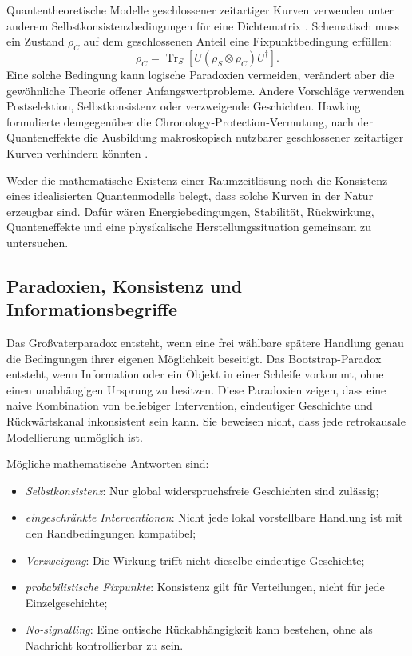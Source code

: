 \documentclass[11pt,a4paper]{article}
\theoremstyle{remark}
\begin{document}
Quantentheoretische Modelle geschlossener zeitartiger Kurven verwenden unter
anderem Selbstkonsistenzbedingungen für eine Dichtematrix
\citep{Deutsch1991}. Schematisch muss ein Zustand \(\rho_C\) auf dem
geschlossenen Anteil eine Fixpunktbedingung erfüllen:
\begin{equation}
\label{eq:ctc-fix}
  \rho_C=\operatorname{Tr}_S\!\left[
  U(\rho_S\otimes\rho_C)U^\dagger
  \right].
\end{equation}
Eine solche Bedingung kann logische Paradoxien vermeiden, verändert aber die
gewöhnliche Theorie offener Anfangswertprobleme. Andere Vorschläge verwenden
Postselektion, Selbstkonsistenz oder verzweigende Geschichten. Hawking
formulierte demgegenüber die Chronology-Protection-Vermutung, nach der
Quanteneffekte die Ausbildung makroskopisch nutzbarer geschlossener
zeitartiger Kurven verhindern könnten \citep{Hawking1992}.

Weder die mathematische Existenz einer Raumzeitlösung noch die Konsistenz
eines idealisierten Quantenmodells belegt, dass solche Kurven in der Natur
erzeugbar sind. Dafür wären Energiebedingungen, Stabilität, Rückwirkung,
Quanteneffekte und eine physikalische Herstellungssituation gemeinsam zu
untersuchen.

\subsection{Paradoxien, Konsistenz und Informationsbegriffe}

Das Großvaterparadox entsteht, wenn eine frei wählbare spätere Handlung genau
die Bedingungen ihrer eigenen Möglichkeit beseitigt. Das Bootstrap-Paradox
entsteht, wenn Information oder ein Objekt in einer Schleife vorkommt, ohne
einen unabhängigen Ursprung zu besitzen. Diese Paradoxien zeigen, dass eine
naive Kombination von beliebiger Intervention, eindeutiger Geschichte und
Rückwärtskanal inkonsistent sein kann. Sie beweisen nicht, dass jede
retrokausale Modellierung unmöglich ist.

Mögliche mathematische Antworten sind:
\begin{itemize}
  \item \emph{Selbstkonsistenz}: Nur global widerspruchsfreie Geschichten sind
  zulässig;
  \item \emph{eingeschränkte Interventionen}: Nicht jede lokal vorstellbare
  Handlung ist mit den Randbedingungen kompatibel;
  \item \emph{Verzweigung}: Die Wirkung trifft nicht dieselbe eindeutige
  Geschichte;
  \item \emph{probabilistische Fixpunkte}: Konsistenz gilt für Verteilungen,
  nicht für jede Einzelgeschichte;
  \item \emph{No-signalling}: Eine ontische Rückabhängigkeit kann bestehen,
  ohne als Nachricht kontrollierbar zu sein.
\end{itemize}
\end{document}
